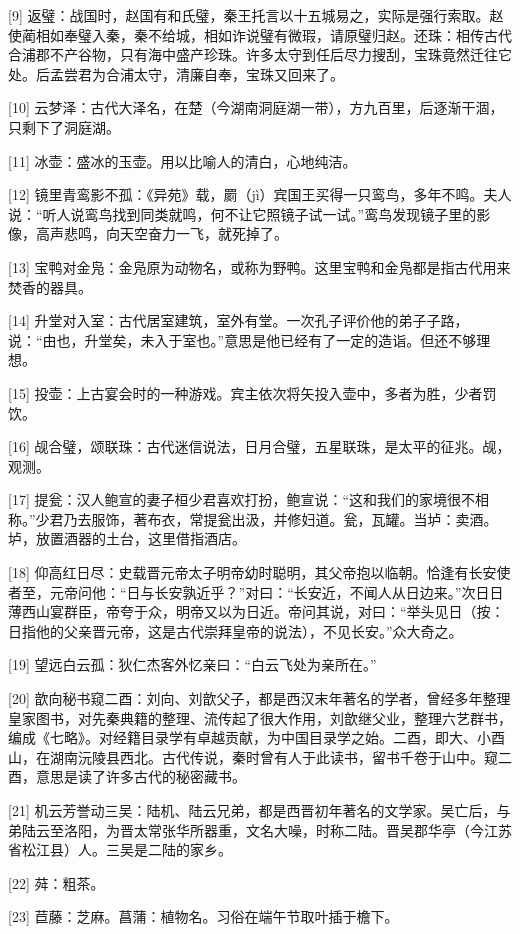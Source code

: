\documentclass[12pt,UTF8]{ctexbook}
\begin{document}
[9] 返璧：战国时，赵国有和氏璧，秦王托言以十五城易之，实际是强行索取。赵使蔺相如奉璧入秦，秦不给城，相如诈说璧有微瑕，请原璧归赵。还珠：相传古代合浦郡不产谷物，只有海中盛产珍珠。许多太守到任后尽力搜刮，宝珠竟然迁往它处。后孟尝君为合浦太守，清廉自奉，宝珠又回来了。

[10] 云梦泽：古代大泽名，在楚（今湖南洞庭湖一带），方九百里，后逐渐干涸，只剩下了洞庭湖。

[11] 冰壶：盛冰的玉壶。用以比喻人的清白，心地纯洁。

[12] 镜里青鸾影不孤：《异苑》载，罽（jì）宾国王买得一只鸾鸟，多年不鸣。夫人说：“听人说鸾鸟找到同类就鸣，何不让它照镜子试一试。”鸾鸟发现镜子里的影像，高声悲鸣，向天空奋力一飞，就死掉了。

[13] 宝鸭对金凫：金凫原为动物名，或称为野鸭。这里宝鸭和金凫都是指古代用来焚香的器具。

[14] 升堂对入室：古代居室建筑，室外有堂。一次孔子评价他的弟子子路，说：“由也，升堂矣，未入于室也。”意思是他已经有了一定的造诣。但还不够理想。

[15] 投壶：上古宴会时的一种游戏。宾主依次将矢投入壶中，多者为胜，少者罚饮。

[16] 觇合璧，颂联珠：古代迷信说法，日月合璧，五星联珠，是太平的征兆。觇，观测。

[17] 提瓮：汉人鲍宣的妻子桓少君喜欢打扮，鲍宣说：“这和我们的家境很不相称。”少君乃去服饰，著布衣，常提瓮出汲，并修妇道。瓮，瓦罐。当垆：卖酒。垆，放置酒器的土台，这里借指酒店。

[18] 仰高红日尽：史载晋元帝太子明帝幼时聪明，其父帝抱以临朝。恰逢有长安使者至，元帝问他：“日与长安孰近乎？”对曰：“长安近，不闻人从日边来。”次日日薄西山宴群臣，帝夸于众，明帝又以为日近。帝问其说，对曰：“举头见日（按：日指他的父亲晋元帝，这是古代崇拜皇帝的说法），不见长安。”众大奇之。

[19] 望远白云孤：狄仁杰客外忆亲曰：“白云飞处为亲所在。”

[20] 歆向秘书窥二酉：刘向、刘歆父子，都是西汉末年著名的学者，曾经多年整理皇家图书，对先秦典籍的整理、流传起了很大作用，刘歆继父业，整理六艺群书，编成《七略》。对经籍目录学有卓越贡献，为中国目录学之始。二酉，即大、小酉山，在湖南沅陵县西北。古代传说，秦时曾有人于此读书，留书千卷于山中。窥二酉，意思是读了许多古代的秘密藏书。

[21] 机云芳誉动三吴：陆机、陆云兄弟，都是西晋初年著名的文学家。吴亡后，与弟陆云至洛阳，为晋太常张华所器重，文名大噪，时称二陆。晋吴郡华亭（今江苏省松江县）人。三吴是二陆的家乡。

[22] 荈：粗茶。

[23] 苣藤：芝麻。菖蒲：植物名。习俗在端午节取叶插于檐下。
\end{document}
